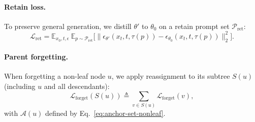 \paragraph{Retain loss.}
To preserve general generation, we distill $\theta'$ to $\theta_0$ on a retain prompt set $\mathcal{P}_{\mathrm{ret}}$:
\begin{equation}
\mathcal{L}_{\mathrm{ret}} =
\mathbb{E}_{x_0,t,\epsilon}\ \mathbb{E}_{p\sim\mathcal{P}_{\mathrm{ret}}}
\Big[
\big\|
\epsilon_{\theta'}(x_t,t,\tau(p)) - \epsilon_{\theta_0}(x_t,t,\tau(p))
\big\|_2^2
\Big].
\label{eq:retain-loss}
\end{equation}

\paragraph{Parent forgetting.}
When forgetting a non-leaf node $u$, we apply reassignment to its subtree $S(u)$ (including $u$ and all descendants):
\begin{equation}
\mathcal{L}_{\mathrm{forget}}(S(u)) \triangleq \sum_{v\in S(u)} \mathcal{L}_{\mathrm{forget}}(v),
\label{eq:forget-subtree}
\end{equation}
with $\mathcal{A}(u)$ defined by Eq.~\eqref{eq:anchor-set-nonleaf}.

